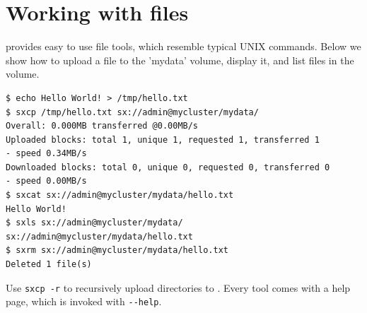 \section*{Working with files}
\SX provides easy to use file tools, which resemble typical UNIX commands.
Below we show how to upload a file to the 'mydata' volume, display it,
and list files in the volume.

\small
\begin{lstlisting}
$ echo Hello World! > /tmp/hello.txt
$ sxcp /tmp/hello.txt sx://admin@mycluster/mydata/
Overall: 0.000MB transferred @0.00MB/s
Uploaded blocks: total 1, unique 1, requested 1, transferred 1
- speed 0.34MB/s
Downloaded blocks: total 0, unique 0, requested 0, transferred 0
- speed 0.00MB/s
$ sxcat sx://admin@mycluster/mydata/hello.txt
Hello World!
$ sxls sx://admin@mycluster/mydata/
sx://admin@mycluster/mydata/hello.txt
$ sxrm sx://admin@mycluster/mydata/hello.txt
Deleted 1 file(s)
\end{lstlisting}
\LARGE
Use \verb+sxcp -r+ to recursively upload directories to \SX. Every tool
comes with a help page, which is invoked with \verb+--help+.
